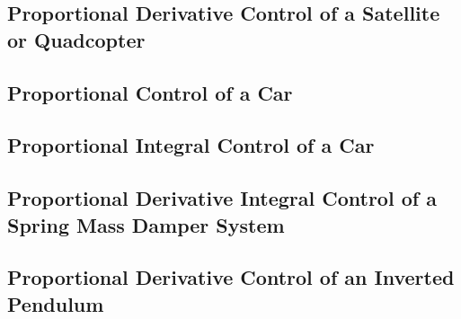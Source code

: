 \subsection{Proportional Derivative Control of a Satellite or Quadcopter}

\subsection{Proportional Control of a Car}

\subsection{Proportional Integral Control of a Car}

\subsection{Proportional Derivative Integral Control of a Spring Mass Damper System}

\subsection{Proportional Derivative Control of an Inverted Pendulum}